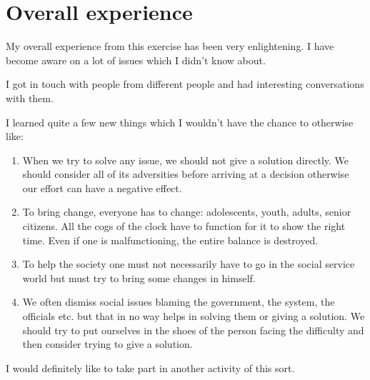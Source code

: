 \chapter{Overall experience}



\vspace{0cm}

My overall experience from this exercise has been very enlightening. I have become aware on a lot of issues which I didn't know about.

I got in touch with people from different people and had interesting conversations with them. 

I learned quite a few new things which I wouldn't have the chance to otherwise like:
\begin{enumerate}
\item When we try to solve any issue, we should not give a solution directly. We should consider all of its adversities before arriving at a decision otherwise our effort can have a negative effect.
\item To bring change, everyone has to change: adolescents, youth, adults, senior citizens. All the cogs of the clock have to function for it to show the right time. Even if one is malfunctioning, the entire balance is destroyed.
\item To help the society one must not necessarily have to go in the social service world but must try to bring some changes in himself.
\item We often dismiss social issues blaming the government, the system, the officials etc. but that in no way helps in solving them or giving a solution. We should try to put ourselves in the shoes of the person facing the difficulty and then consider trying to give a solution.
\end{enumerate}

I would definitely like to take part in another activity of this sort.

\newpage

